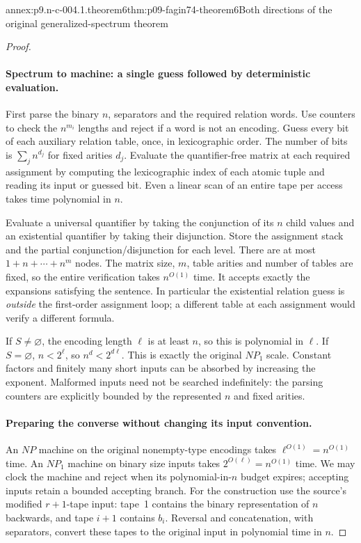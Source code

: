 \begin{annexitem}{annex:p9.n-c-004.1.theorem6}{thm:p09-fagin74-theorem6}{Both directions of the original generalized-spectrum theorem}
\begin{proof}
\paragraph{Spectrum to machine: a single guess followed by deterministic evaluation.}
First parse the binary \(n\), separators and the required relation words.
Use counters to check the \(n^{m_i}\) lengths and reject if a word is not
an encoding.  Guess every bit of each auxiliary relation table, once, in
lexicographic order.  The number of bits is \(\sum_j n^{d_j}\) for fixed
arities \(d_j\).  Evaluate the quantifier-free matrix at each required
assignment by computing the lexicographic index of each atomic tuple and
reading its input or guessed bit.  Even a linear scan of an entire tape
per access takes time polynomial in \(n\).

Evaluate a universal quantifier by taking the conjunction of its \(n\)
child values and an existential quantifier by taking their disjunction.
Store the assignment stack and the partial conjunction/disjunction for each
level.  There are at most \(1+n+\cdots+n^m\) nodes.  The matrix size,
\(m\), table arities and number of tables are fixed, so the entire
verification takes \(n^{O(1)}\) time.  It accepts exactly the expansions
satisfying the sentence.  In particular the existential relation guess is
\emph{outside} the first-order assignment loop; a different table at each
assignment would verify a different formula.

If \(S\ne\varnothing\), the encoding length \(\ell\) is at least
\(n\), so this is polynomial in \(\ell\).  If \(S=\varnothing\),
\(n<2^\ell\), so \(n^d<2^{d\ell}\).  This is exactly the original
\(NP_1\) scale.  Constant factors and finitely many short inputs can be
absorbed by increasing the exponent.  Malformed inputs need not be searched
indefinitely: the parsing counters are explicitly bounded by the represented
\(n\) and fixed arities.

\paragraph{Preparing the converse without changing its input convention.}
An \(NP\) machine on the original nonempty-type encodings takes
\(\ell^{O(1)}=n^{O(1)}\) time.  An \(NP_1\) machine on binary size
inputs takes \(2^{O(\ell)}=n^{O(1)}\) time.  We may clock the machine
and reject when its polynomial-in-\(n\) budget expires; accepting inputs
retain a bounded accepting branch.  For the construction use the source's
modified \(r+1\)-tape input: tape~1 contains the binary representation
of \(n\) backwards, and tape \(i+1\) contains \(b_i\).
Reversal and concatenation, with separators, convert these tapes to the
original input in polynomial time in \(n\).


\end{proof}
\end{annexitem}

